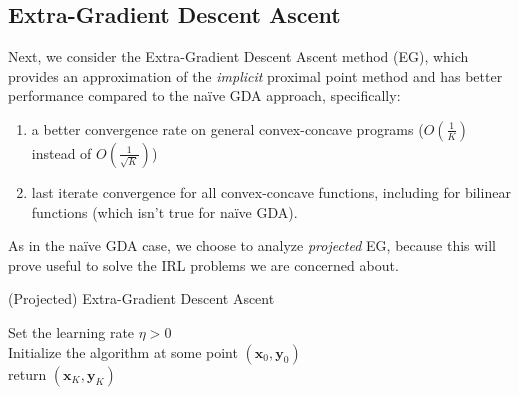\subsection{Extra-Gradient Descent Ascent}
\label{sec:extra_grad}

Next, we consider the Extra-Gradient Descent Ascent method (EG), which provides an approximation of the \textit{implicit} proximal point method and has better performance compared to the naïve GDA approach, specifically:
\begin{enumerate}
    \item a better convergence rate on general convex-concave programs ($O(\frac{1}{K})$ instead of $O(\frac{1}{\sqrt{K}})$)
    \item last iterate convergence for all convex-concave functions, including for bilinear functions (which isn't true for naïve GDA).
\end{enumerate}

As in the naïve GDA case, we choose to analyze \textit{projected} EG, because this will prove useful to solve the IRL problems we are concerned about.

\begin{algorithm}[H]
    \label{alg:projEG}
    \SetAlgoLined
    \caption{(Projected) Extra-Gradient Descent Ascent}
    Set the learning rate $\eta >0$ \\
    Initialize the algorithm at some point $(\bm{x}_0,\bm{y}_0)$  \\
    return $(\bm{x}_K,\bm{y}_K)$
\end{algorithm}


